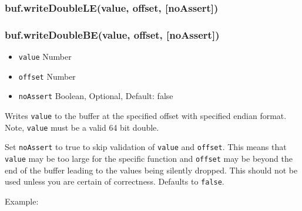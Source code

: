 \subsubsection{buf.writeDoubleLE(value, offset, {[}noAssert{]})}

\subsubsection{buf.writeDoubleBE(value, offset, {[}noAssert{]})}

\begin{itemize}
\item
  \texttt{value} Number
\item
  \texttt{offset} Number
\item
  \texttt{noAssert} Boolean, Optional, Default: false
\end{itemize}

Writes \texttt{value} to the buffer at the specified offset with
specified endian format. Note, \texttt{value} must be a valid 64 bit
double.

Set \texttt{noAssert} to true to skip validation of \texttt{value} and
\texttt{offset}. This means that \texttt{value} may be too large for the
specific function and \texttt{offset} may be beyond the end of the
buffer leading to the values being silently dropped. This should not be
used unless you are certain of correctness. Defaults to \texttt{false}.

Example:

\begin{Shaded}
\begin{Highlighting}[]
  \NormalTok{);}
\NormalTok{(}\NormalTok{, }\NormalTok{);}


\NormalTok{(}\NormalTok{, }\NormalTok{);}


\end{Highlighting}
\end{Shaded}

